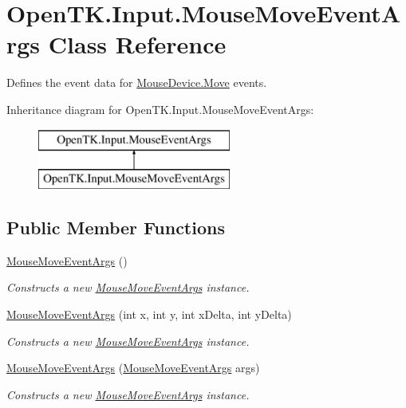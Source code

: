 \hypertarget{class_open_t_k_1_1_input_1_1_mouse_move_event_args}{\section{Open\-T\-K.\-Input.\-Mouse\-Move\-Event\-Args Class Reference}
\label{class_open_t_k_1_1_input_1_1_mouse_move_event_args}
}


Defines the event data for \hyperlink{class_open_t_k_1_1_input_1_1_mouse_device_ae98bb40aa03f634ecb53a73971dd9097}{Mouse\-Device.\-Move} events.  


Inheritance diagram for Open\-T\-K.\-Input.\-Mouse\-Move\-Event\-Args\-:\begin{figure}[H]
\begin{center}
\leavevmode
\includegraphics[height=2.000000cm]{class_open_t_k_1_1_input_1_1_mouse_move_event_args}
\end{center}
\end{figure}
\subsection*{Public Member Functions}
\begin{DoxyCompactItemize}
\item 
\hyperlink{class_open_t_k_1_1_input_1_1_mouse_move_event_args_adfa1d205d8867b6a3d5812d8eb4da256}{Mouse\-Move\-Event\-Args} ()
\begin{DoxyCompactList}\small\item\em Constructs a new \hyperlink{class_open_t_k_1_1_input_1_1_mouse_move_event_args}{Mouse\-Move\-Event\-Args} instance. \end{DoxyCompactList}\item 
\hyperlink{class_open_t_k_1_1_input_1_1_mouse_move_event_args_a563702b287acb6b436e888537bf1cd1e}{Mouse\-Move\-Event\-Args} (int x, int y, int x\-Delta, int y\-Delta)
\begin{DoxyCompactList}\small\item\em Constructs a new \hyperlink{class_open_t_k_1_1_input_1_1_mouse_move_event_args}{Mouse\-Move\-Event\-Args} instance. \end{DoxyCompactList}\item 
\hyperlink{class_open_t_k_1_1_input_1_1_mouse_move_event_args_a39916bdada80b3d23a6309988505fd22}{Mouse\-Move\-Event\-Args} (\hyperlink{class_open_t_k_1_1_input_1_1_mouse_move_event_args}{Mouse\-Move\-Event\-Args} args)
\begin{DoxyCompactList}\small\item\em Constructs a new \hyperlink{class_open_t_k_1_1_input_1_1_mouse_move_event_args}{Mouse\-Move\-Event\-Args} instance. \end{DoxyCompactList}\end{DoxyCompactItemize}

